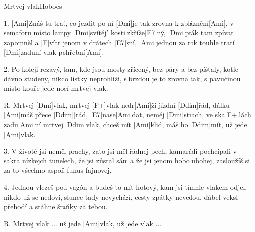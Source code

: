 \begin{song}{Mrtvej vlak}{Hoboes}

\begin{xverse}{1. }
[Ami]Znáš tu trať, co jezdit po ní [Dmi]je tak zrovna k zbláznění[Ami],
v semaforu místo lampy [Dmi]svítěj' kosti zkříže[E7]ný,
[Dmi]pták tam zpívat zapomněl a [F]vítr jenom v drátech [E7]zní,
[Ami]jednou za rok touhle tratí [Dmi]zaduní vlak pohřební[Ami].
\end{xverse}

\begin{xverse}{2. }
Po koleji rezavý, tam, kde jsou mosty zřícený,
bez páry a bez píšťaly, kotle dávno studený,
nikdo lístky neprohlíží, s brzdou je to zrovna tak,
s pavučinou místo kouře jede nocí mrtvej vlak.
\end{xverse}

\begin{xverse}{R. }
Mrtvej [Dmi]vlak, mrtvej [F+]vlak nedr[Ami]{}ží jízdní [Ddim]{}řád,
dálku [Ami]máš přece [Ddim|]{rád,} [E7]nase[Ami]dat,
neměj [Dmi]strach, ve ska[F+]lách zadu[Ami]ní mrtvej [Ddim]vlak,
chceš mít [Ami]klid, máš ho [Ddim]mít, už jede [Ami]vlak.
\end{xverse}

\begin{xverse}{3. }
V životě jsi neměl prachy, zato jsi měl řádnej pech,
kamarádi pochcípali v sakra nízkejch tunelech,
že jsi zůstal sám a že jsi jenom hobo ubohej,
zasloužíš si za to všechno aspoň funus fajnovej.
\end{xverse}

\begin{xverse}{4. }
Jednou vlezeš pod vagón a budeš to mít hotový,
kam jsi tímhle vlakem odjel, nikdo už se nedoví,
slunce tady nevychází, cesty zpátky nevedou,
ďábel veksl přehodí a stáhne šraňky za tebou.
\end{xverse}

\begin{xverse}{R. }
Mrtvej vlak ...
už jede [Ami]vlak, už jede vlak ...
\end{xverse}

\end{song}

